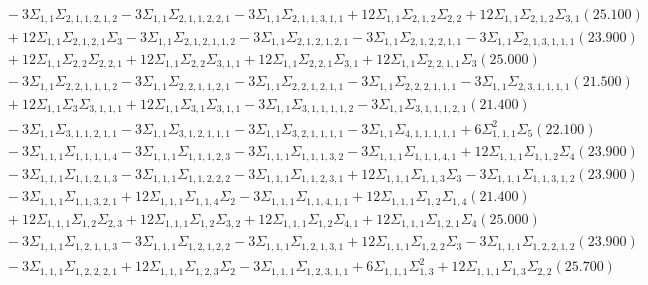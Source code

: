 \documentclass[12pt]{article}
\begin{document}
\begin{landscape}
\begin{align*}
		&\quad\quad -3\Sigma_{1,1}\Sigma_{2,1,1,2,1,2}-3\Sigma_{1,1}\Sigma_{2,1,1,2,2,1}-3\Sigma_{1,1}\Sigma_{2,1,1,3,1,1}+12\Sigma_{1,1}\Sigma_{2,1,2}\Sigma_{2,2}+12\Sigma_{1,1}\Sigma_{2,1,2}\Sigma_{3,1}(25.100) \\ 
		&\quad\quad +12\Sigma_{1,1}\Sigma_{2,1,2,1}\Sigma_{3}-3\Sigma_{1,1}\Sigma_{2,1,2,1,1,2}-3\Sigma_{1,1}\Sigma_{2,1,2,1,2,1}-3\Sigma_{1,1}\Sigma_{2,1,2,2,1,1}-3\Sigma_{1,1}\Sigma_{2,1,3,1,1,1}(23.900) \\ 
		&\quad\quad +12\Sigma_{1,1}\Sigma_{2,2}\Sigma_{2,2,1}+12\Sigma_{1,1}\Sigma_{2,2}\Sigma_{3,1,1}+12\Sigma_{1,1}\Sigma_{2,2,1}\Sigma_{3,1}+12\Sigma_{1,1}\Sigma_{2,2,1,1}\Sigma_{3}(25.000) \\ 
		&\quad\quad -3\Sigma_{1,1}\Sigma_{2,2,1,1,1,2}-3\Sigma_{1,1}\Sigma_{2,2,1,1,2,1}-3\Sigma_{1,1}\Sigma_{2,2,1,2,1,1}-3\Sigma_{1,1}\Sigma_{2,2,2,1,1,1}-3\Sigma_{1,1}\Sigma_{2,3,1,1,1,1}(21.500) \\ 
		&\quad\quad +12\Sigma_{1,1}\Sigma_{3}\Sigma_{3,1,1,1}+12\Sigma_{1,1}\Sigma_{3,1}\Sigma_{3,1,1}-3\Sigma_{1,1}\Sigma_{3,1,1,1,1,2}-3\Sigma_{1,1}\Sigma_{3,1,1,1,2,1}(21.400) \\ 
		&\quad\quad -3\Sigma_{1,1}\Sigma_{3,1,1,2,1,1}-3\Sigma_{1,1}\Sigma_{3,1,2,1,1,1}-3\Sigma_{1,1}\Sigma_{3,2,1,1,1,1}-3\Sigma_{1,1}\Sigma_{4,1,1,1,1,1}+6\Sigma_{1,1,1}^{2}\Sigma_{5}(22.100) \\ 
		&\quad\quad -3\Sigma_{1,1,1}\Sigma_{1,1,1,1,4}-3\Sigma_{1,1,1}\Sigma_{1,1,1,2,3}-3\Sigma_{1,1,1}\Sigma_{1,1,1,3,2}-3\Sigma_{1,1,1}\Sigma_{1,1,1,4,1}+12\Sigma_{1,1,1}\Sigma_{1,1,2}\Sigma_{4}(23.900) \\ 
		&\quad\quad -3\Sigma_{1,1,1}\Sigma_{1,1,2,1,3}-3\Sigma_{1,1,1}\Sigma_{1,1,2,2,2}-3\Sigma_{1,1,1}\Sigma_{1,1,2,3,1}+12\Sigma_{1,1,1}\Sigma_{1,1,3}\Sigma_{3}-3\Sigma_{1,1,1}\Sigma_{1,1,3,1,2}(23.900) \\ 
		&\quad\quad -3\Sigma_{1,1,1}\Sigma_{1,1,3,2,1}+12\Sigma_{1,1,1}\Sigma_{1,1,4}\Sigma_{2}-3\Sigma_{1,1,1}\Sigma_{1,1,4,1,1}+12\Sigma_{1,1,1}\Sigma_{1,2}\Sigma_{1,4}(21.400) \\ 
		&\quad\quad +12\Sigma_{1,1,1}\Sigma_{1,2}\Sigma_{2,3}+12\Sigma_{1,1,1}\Sigma_{1,2}\Sigma_{3,2}+12\Sigma_{1,1,1}\Sigma_{1,2}\Sigma_{4,1}+12\Sigma_{1,1,1}\Sigma_{1,2,1}\Sigma_{4}(25.000) \\ 
		&\quad\quad -3\Sigma_{1,1,1}\Sigma_{1,2,1,1,3}-3\Sigma_{1,1,1}\Sigma_{1,2,1,2,2}-3\Sigma_{1,1,1}\Sigma_{1,2,1,3,1}+12\Sigma_{1,1,1}\Sigma_{1,2,2}\Sigma_{3}-3\Sigma_{1,1,1}\Sigma_{1,2,2,1,2}(23.900) \\ 
		&\quad\quad -3\Sigma_{1,1,1}\Sigma_{1,2,2,2,1}+12\Sigma_{1,1,1}\Sigma_{1,2,3}\Sigma_{2}-3\Sigma_{1,1,1}\Sigma_{1,2,3,1,1}+6\Sigma_{1,1,1}\Sigma_{1,3}^{2}+12\Sigma_{1,1,1}\Sigma_{1,3}\Sigma_{2,2}(25.700) \\ 

\end{align*}
\end{landscape}
\end{document}
